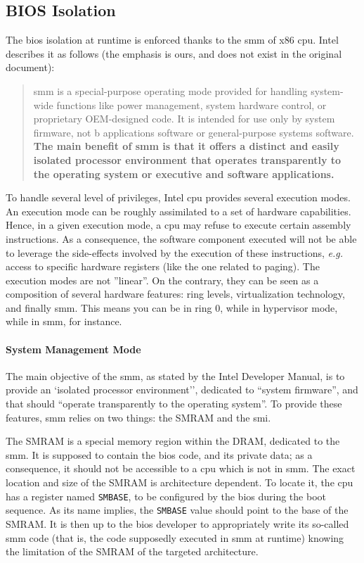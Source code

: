 \subsection{BIOS Isolation}

The \ac{bios} isolation at runtime is enforced thanks to the \ac{smm} of x86
\ac{cpu}.
%
Intel describes it as follows (the emphasis is ours, and does not exist in the
original document):

\begin{quote}
  \ac{smm} is a special-purpose operating mode provided for handling system-wide
  functions like power management, system hardware control, or proprietary
  OEM-designed code.
  It is intended for use only by system firmware, not b applications software or
  general-purpose systems software.
  \textbf{The main benefit of \ac{smm} is that it offers a distinct and easily
    isolated processor environment that operates transparently to the operating
    system or executive and software applications.}
\end{quote}

To handle several level of privileges, Intel \ac{cpu} provides several execution
modes.
%
An execution mode can be roughly assimilated to a set of hardware capabilities.
%
Hence, in a given execution mode, a \ac{cpu} may refuse to execute certain assembly
instructions.
%
As a consequence, the software component executed will not be able to leverage
the side-effects involved by the execution of these instructions, \emph{e.g.}
access to specific hardware registers (like the one related to paging).
%
The execution modes are not ''linear''.
%
On the contrary, they can be seen as a composition of several hardware features:
ring levels, virtualization technology, and finally \ac{smm}.
%
This means you can be in ring 0, while in hypervisor mode, while in \ac{smm},
for instance.

\paragraph{System Management Mode}
%
The main objective of the \ac{smm}, as stated by the Intel Developer Manual, is
to provide an `isolated processor environment'', dedicated to ``system
firmware'', and that should ``operate transparently to the operating system''.
%
To provide these features, \ac{smm} relies on two things: the SMRAM and the
\ac{smi}.

The SMRAM is a special memory region within the DRAM, dedicated to the \ac{smm}.
%
It is supposed to contain the \ac{bios} code, and its private data;
%
as a consequence, it should not be accessible to a \ac{cpu} which is not in
\ac{smm}.
%
The exact location and size of the SMRAM is architecture dependent.
%
To locate it, the \ac{cpu} has a register named \texttt{SMBASE}, to be configured by
the \ac{bios} during the boot sequence.
%
As its name implies, the \texttt{SMBASE} value should point to the base of the
SMRAM.
%
It is then up to the \ac{bios} developer to appropriately write its so-called
\ac{smm} code (that is, the code supposedly executed in \ac{smm} at runtime)
knowing the limitation of the SMRAM of the targeted architecture.

